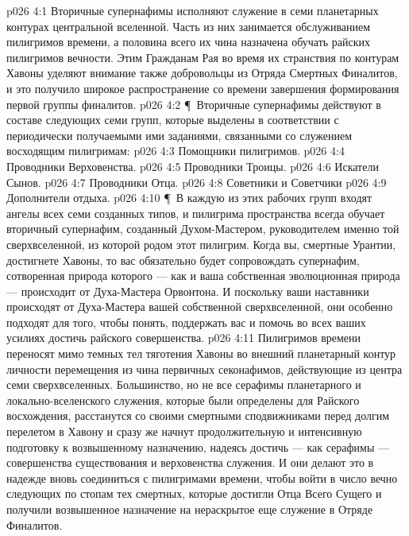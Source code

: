 \vs p026 4:1 Вторичные супернафимы исполняют служение в семи планетарных контурах центральной вселенной. Часть из них занимается обслуживанием пилигримов времени, а половина всего их чина назначена обучать райских пилигримов вечности. Этим Гражданам Рая во время их странствия по контурам Хавоны уделяют внимание также добровольцы из Отряда Смертных Финалитов, и это получило широкое распространение со времени завершения формирования первой группы финалитов.
\vs p026 4:2 \P\ Вторичные супернафимы действуют в составе следующих семи групп, которые выделены в соответствии с периодически получаемыми ими заданиями, связанными со служением восходящим пилигримам:
\vs p026 4:3 \bibnobreakspace Помощники пилигримов.
\vs p026 4:4 \bibnobreakspace Проводники Верховенства.
\vs p026 4:5 \bibnobreakspace Проводники Троицы.
\vs p026 4:6 \bibnobreakspace Искатели Сынов.
\vs p026 4:7 \bibnobreakspace Проводники Отца.
\vs p026 4:8 \bibnobreakspace Советники и Советчики
\vs p026 4:9 \bibnobreakspace Дополнители отдыха.
\vs p026 4:10 \P\ В каждую из этих рабочих групп входят ангелы всех семи созданных типов, и пилигрима пространства всегда обучает вторичный супернафим, созданный Духом\hyp{}Мастером, руководителем именно той сверхвселенной, из которой родом этот пилигрим. Когда вы, смертные Урантии, достигнете Хавоны, то вас обязательно будет сопровождать супернафим, сотворенная природа которого --- как и ваша собственная эволюционная природа --- происходит от Духа\hyp{}Мастера Орвонтона. И поскольку ваши наставники происходят от Духа\hyp{}Мастера вашей собственной сверхвселенной, они особенно подходят для того, чтобы понять, поддержать вас и помочь во всех ваших усилиях достичь райского совершенства.
\vs p026 4:11 Пилигримов времени переносят мимо темных тел тяготения Хавоны во внешний планетарный контур личности перемещения из чина первичных секонафимов, действующие из центра семи сверхвселенных. Большинство, но не все серафимы планетарного и локально\hyp{}вселенского служения, которые были определены для Райского восхождения, расстанутся со своими смертными сподвижниками перед долгим перелетом в Хавону и сразу же начнут продолжительную и интенсивную подготовку к возвышенному назначению, надеясь достичь --- как серафимы --- совершенства существования и верховенства служения. И они делают это в надежде вновь соединиться с пилигримами времени, чтобы войти в число вечно следующих по стопам тех смертных, которые достигли Отца Всего Сущего и получили возвышенное назначение на нераскрытое еще служение в Отряде Финалитов.
